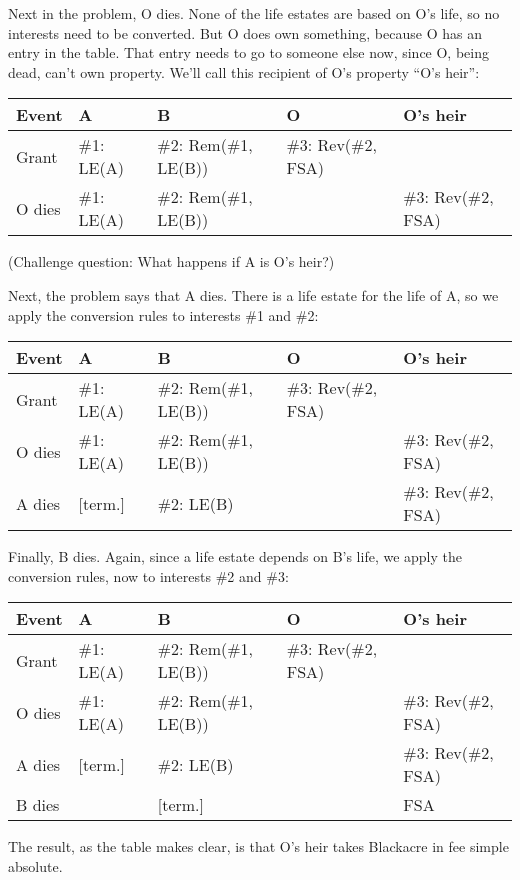 Next in the problem, O dies. None of the life estates are based on O's life, so
no interests need to be converted. But O does own something, because O has an
entry in the table. That entry needs to go to someone else now, since O, being
dead, can't own property. We'll call this recipient of O's property ``O's
heir'':
\begin{center}
\begin{tabular}{l|llll}
Event & A & B & O & O's heir \\
\hline
Grant & \#1: LE(A) & \#2: Rem(\#1, LE(B)) & \#3: Rev(\#2, FSA) & \\
O dies & \#1: LE(A) & \#2: Rem(\#1, LE(B)) & & \#3: Rev(\#2, FSA) \\
\end{tabular}
\end{center}
(Challenge question: What happens if A is O's heir?)

Next, the problem says that A dies. There is a life estate for the life of A, so
we apply the conversion rules to interests \#1 and \#2:
\begin{center}
\begin{tabular}{l|llll}
Event & A & B & O & O's heir \\
\hline
Grant & \#1: LE(A) & \#2: Rem(\#1, LE(B)) & \#3: Rev(\#2, FSA) & \\
O dies & \#1: LE(A) & \#2: Rem(\#1, LE(B)) & & \#3: Rev(\#2, FSA) \\
A dies & [term.] & \#2: LE(B) & & \#3: Rev(\#2, FSA) \\
\end{tabular}
\end{center}
Finally, B dies. Again, since a life estate depends on B's life, we apply the
conversion rules, now to interests \#2 and \#3:
\begin{center}
\begin{tabular}{l|llll}
Event & A & B & O & O's heir \\
\hline
Grant & \#1: LE(A) & \#2: Rem(\#1, LE(B)) & \#3: Rev(\#2, FSA) & \\
O dies & \#1: LE(A) & \#2: Rem(\#1, LE(B)) & & \#3: Rev(\#2, FSA) \\
A dies & [term.] & \#2: LE(B) & & \#3: Rev(\#2, FSA) \\
B dies & & [term.] & & FSA \\
\end{tabular}
\end{center}
The result, as the table makes clear, is that O's heir takes Blackacre in fee
simple absolute.

